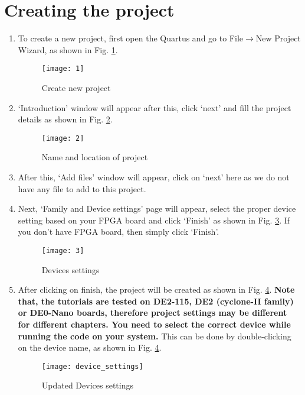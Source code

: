 \section{Creating the project} \label{sec:new_project}
\begin{enumerate}
	\item To create a new project, first open the Quartus and go to File$\rightarrow$New Project Wizard, as shown in Fig. \ref{fig:createNewProject}. 
	
	\begin{figure}[!h]
		\centering
		\texttt{[image: 1]}
		\caption{Create new project}
		\label{fig:createNewProject}
	\end{figure}
	
	\item `Introduction' window will appear after this, click `next' and fill the project details as shown in Fig. \ref{fig:nameProject}. 
	
	\begin{figure}[!h]
		\centering
		\texttt{[image: 2]}
		\caption{Name and location of project}
		\label{fig:nameProject}
	\end{figure}
	
	\item After this, `Add files' window will appear, click on `next' here as we do not have any file to add to this project. 
	
	\item Next, `Family and Device settings' page will appear, select the proper device setting based on your FPGA board and click `Finish' as shown in Fig. \ref{fig:deviceSettings}. If you don't have FPGA board, then simply click `Finish'. 
	\begin{figure}[h]
		\centering
		\texttt{[image: 3]}
		\caption{Devices settings}
		\label{fig:deviceSettings}
	\end{figure}
	
	
	\item After clicking on finish, the project will be created as shown in Fig. \ref{fig:device_settings}. \textbf{Note that, the tutorials are tested on DE2-115, DE2 (cyclone-II family) or DE0-Nano boards, therefore project settings may be different for different chapters. You need to select the correct device while running the code on your system.} This can be done by double-clicking on the device name, as shown in Fig. \ref{fig:device_settings}.
	
	\begin{figure}[h]
		\centering
		\texttt{[image: device\_settings]}
		\caption{Updated Devices settings}
		\label{fig:device_settings}
	\end{figure}
\end{enumerate}

